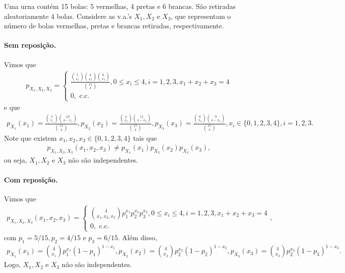 \documentclass[../Notas.tex]{subfiles}
\begin{document}
\begin{example}
Uma urna contém 15 bolas: 5 vermelhas, 4 pretas e 6 brancas. São retiradas aleatoriamente 4 bolas. Considere as v.a.'s $X_1, X_2$ e $X_3$, que representam o número de bolas vermelhas, pretas e brancas retiradas, respectivamente.
\paragraph{Sem reposição.} Vimos que
\begin{align*}
    p_{X_1, X_2, X_3} = \begin{cases}
    \frac{ \binom{5}{x_1}\binom{4}{x_2}\binom{6}{x_3} }{\binom{15}{4}}, 0\leq x_i\leq 4, i=1,2,3, x_1+x_2+x_3=4 \\
    0, \text{ c.c.}
    \end{cases}
\end{align*}
e que
\begin{align*}
    p_{X_1}(x_1) = \frac{ \binom{5}{x_1}\binom{10}{4-x_1} }{\binom{15}{4}}, p_{X_2}(x_2) = \frac{ \binom{4}{x_2}\binom{11}{4-x_2} }{\binom{15}{4}}, p_{X_3}(x_3) = \frac{ \binom{6}{x_3}\binom{9}{4-x_3} }{\binom{15}{4}}, x_i\in\{ 0,1,2,3,4 \}, i=1,2,3.
\end{align*}
Note que existem $x_1, x_2, x_3\in\{0,1,2,3,4\}$ tais que
\begin{align*}
    p_{X_1, X_2, X_3}(x_1, x_2, x_3) \neq p_{X_1}(x_1)p_{X_2}(x_2)p_{X_3}(x_3),
\end{align*}
ou seja, $X_1, X_2$ e $X_3$ não são independentes.

\paragraph{Com reposição.} Vimos que
\begin{align*}
    p_{X_1, X_2, X_3}(x_1, x_2, x_3) = \begin{cases}
    \binom{4}{x_1, x_2, x_3}p_1^{x_1}p_2^{x_2}p_3^{x_3}, 0\leq x_i\leq 4, i=1,2,3, x_1+x_2+x_3=4 \\
    0, \text{ c.c.}
    \end{cases},
\end{align*}
com $p_1=5/15, p_2=4/15$ e $p_3=6/15$. Além disso, 
\begin{align*}
    p_{X_1}(x_1) = \binom{4}{x_1}p_1^{x_1}(1-p_1)^{1-x_1}, p_{X_2}(x_2) = \binom{4}{x_2}p_2^{x_2}(1-p_2)^{1-x_2},
    p_{X_3}(x_3) = \binom{4}{x_3}p_2^{x_3}(1-p_3)^{1-x_3}.
\end{align*}
Logo, $X_1, X_2$ e $X_3$ não são independentes.
\end{example}
\end{document}
